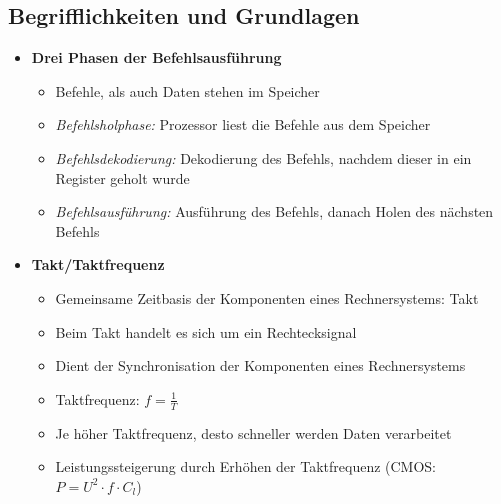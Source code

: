 \subsection{Begrifflichkeiten und Grundlagen}
    \begin{itemize}
        \item \textbf{Drei Phasen der Befehlsausführung}
            \begin{itemize}
                \item Befehle, als auch Daten stehen im Speicher
                \item \textit{Befehlsholphase:} Prozessor liest die Befehle aus dem Speicher
                \item \textit{Befehlsdekodierung:} Dekodierung des Befehls, nachdem dieser in ein Register geholt wurde
                \item \textit{Befehlsausführung:} Ausführung des Befehls, danach Holen des nächsten Befehls
            \end{itemize}

        \item \textbf{Takt/Taktfrequenz}
            \begin{itemize}
                \item Gemeinsame Zeitbasis der Komponenten eines Rechnersystems: Takt
                \item Beim Takt handelt es sich um ein Rechtecksignal
                \item Dient der Synchronisation der Komponenten eines Rechnersystems
                \item Taktfrequenz: $f = \frac{1}{T}$
                \item Je höher Taktfrequenz, desto schneller werden Daten verarbeitet
                \item Leistungssteigerung durch Erhöhen der Taktfrequenz (CMOS: $P = U^2 \cdot f \cdot C_l$)
            \end{itemize}


\end{itemize}
